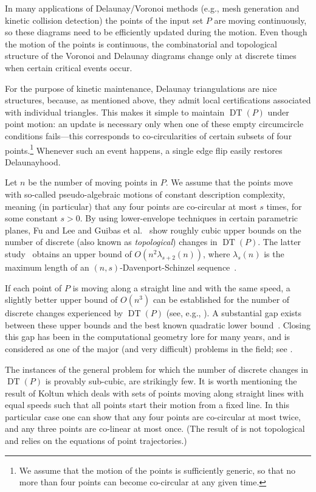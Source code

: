 \documentclass[letter,11pt]{article}
\def\DT{\mathop{\mathrm{DT}}}
\begin{document}
In many applications of Delaunay/Voronoi methods (e.g., mesh generation and kinetic collision detection) the points of the input set $P$ are moving continuously, so
these diagrams need to be efficiently updated during the motion.
Even though the motion of the points is continuous, the combinatorial and topological structure of the Voronoi and
Delaunay diagrams change only at
discrete times when certain critical events occur. 


For the purpose of kinetic maintenance, Delaunay triangulations are 
nice structures, because, as mentioned above, they admit local 
certifications associated with individual triangles.  This makes 
it simple to maintain $\DT(P)$ under point motion: an update is 
necessary only when one of these empty circumcircle conditions 
fails---this corresponds to co-circularities of certain subsets of
four points.\footnote{We assume that the motion of the points is sufficiently generic, so that no more than four points can become co-circular at any given time.} Whenever such an event happens, 
a single edge flip easily restores Delaunayhood. 



Let $n$ be the number of moving points in $P$. 
We assume that the
points move with so-called pseudo-algebraic motions of constant description complexity, meaning (in particular) that any four points are co-circular at most $s$ times, for some constant $s>0$.  
By using lower-envelope techniques in certain parametric planes, 
Fu and Lee \cite{FuLee} and
Guibas et al.~\cite{gmr-vdmpp-92} show roughly cubic upper bounds on the number of discrete (also known as \textit{topological}) changes in $\DT(P)$. 
The latter study~\cite{gmr-vdmpp-92} obtains an upper bound of
$O(n^2 \lambda_{s+2}(n))$, where $\lambda_s(n)$ is the maximum length
of an $(n,s)$-Davenport-Schinzel sequence~\cite{SA95}.


If each point of $P$ is moving along a straight line and with the same speed, a slightly better upper bound of $O(n^3)$ can be established for the number of discrete changes experienced by $\DT(P)$ (see, e.g., \cite{Vladlen}). A substantial gap exists between these upper bounds
and the best known quadratic lower bound~\cite{SA95}. Closing this gap has been in the 
computational geometry lore for many years, and is considered as one of the major (and very difficult) problems in the field; see \cite{TOPP}.



The instances of the general problem for which the number of discrete changes in $\DT(P)$ is provably sub-cubic, are strikingly few. It is worth mentioning the result of Koltun \cite{Vladlen} which deals with sets of points moving along straight lines with equal speeds such that all points start their motion from a fixed line. In this particular case one can show that any four points are co-circular at most twice, and any three points are co-linear at most once. (The result of \cite{Vladlen} is not topological and relies on the equations of point trajectories.)
\end{document}
